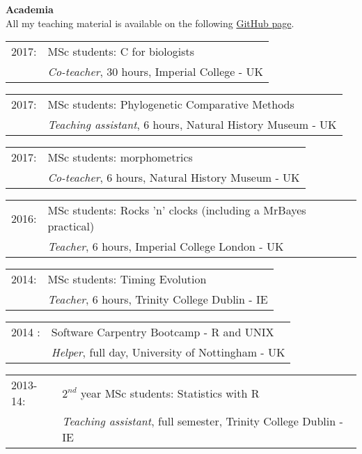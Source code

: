 \documentclass[10pt,a4paper]{article}
\begin{document}
{\raggedright\textbf{Academia}\\[1.5ex]
All my teaching material is available on the following \href{https://github.com/TGuillermeTeaching}{GitHub page}.
\begin{tabular}{ll}
2017: & MSc students: C for biologists\\
      & \textit{Co-teacher}, 30 hours, Imperial College - UK \\
\end{tabular}
\begin{tabular}{ll}
2017: & MSc students: Phylogenetic Comparative Methods\\
      & \textit{Teaching assistant}, 6 hours, Natural History Museum - UK \\
\end{tabular}
\begin{tabular}{ll}
2017: & MSc students: morphometrics\\
      & \textit{Co-teacher}, 6 hours, Natural History Museum - UK \\
\end{tabular}
\begin{tabular}{ll}
2016: & MSc students: Rocks 'n' clocks (including a MrBayes practical)\\
      & \textit{Teacher}, 6 hours, Imperial College London - UK \\
\end{tabular}
\begin{tabular}{ll}
2014: & MSc students: Timing Evolution \\
      & \textit{Teacher}, 6 hours, Trinity College Dublin - IE \\
\end{tabular}
\begin{tabular}{ll}
2014 : & Software Carpentry Bootcamp - R and UNIX \\
      & \textit{Helper}, full day, University of Nottingham - UK \\
\end{tabular}
\begin{tabular}{ll}
2013-14: & $2^{nd}$ year MSc students: Statistics with R \\
         & \textit{Teaching assistant}, full semester, Trinity College Dublin - IE \\

\end{tabular}}
\end{document}
